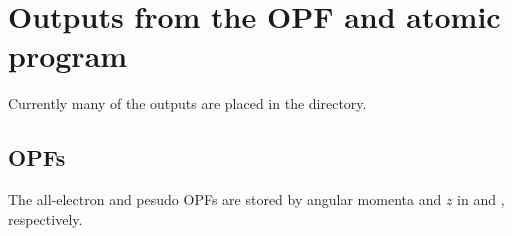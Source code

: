 \documentclass[11pt]{report}
\begin{document}



\section{Outputs from the OPF and atomic program}
Currently many of the outputs are placed in the  directory.

\subsection{OPFs}
The all-electron and pesudo OPFs are stored by angular momenta and $z$ in  and , respectively.
\end{document}
